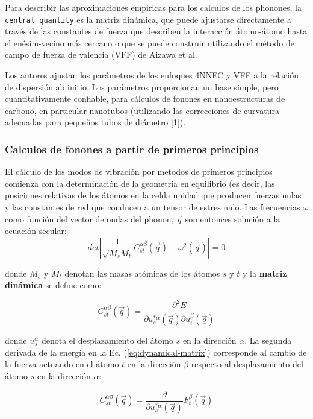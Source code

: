 \documentclass[11pt]{article}
\begin{document}
Para describir las aproximaciones empiricas para los calculos de los phonones, la \texttt{central quantity} es la matriz dinámica, que puede ajustarse directamente a través de las
constantes de fuerza que describen la interacción átomo-átomo hasta el enésim-vecino más cercano o que se puede construir utilizando el método de campo de fuerza de valencia (VFF) de Aizawa et al.

Los autores ajustan los parámetros de los enfoques 4NNFC y VFF a la relación de dispersión ab initio. Los parámetros proporcionan un base simple, pero cuantitativamente confiable, para cálculos de fonones en nanoestructuras de carbono, en particular nanotubos (utilizando las correcciones de curvatura adecuadas para pequeños
tubos de diámetro [1]).

\subsubsection{Calculos de fonones a partir de primeros principios}
\label{sec:org2cad9bc}
El cálculo de los modos de vibración por metodos de primeros principios comienza con la determinación de la geometria en equilibrio (es decir, las posiciones relativas de los átomos en la celda unidad que producen fuerzas nulas y las constantes de red que conducen a un tensor de estres nulo. Las frecuencias \(\omega\) como función del vector de ondas del phonon, \(\vec q\) son entonces solución a la ecuación secular:
\begin{equation}
det\left|\frac{1}{\sqrt{M_s M_t}}C^{\alpha\beta}_{s t}(\vec q)-\omega^2(\vec q)\right|=0
\end{equation}

donde \(M_s\) y \(M_t\) denotan las masas atómicas de los átomos \(s\) y \(t\) y la \textbf{matriz dinámica} se define como: 

\begin{equation}\boxed{
C^{\alpha\beta}_{s t}(\vec q)=\frac{\partial^2E}{\partial u^{*\alpha}_s (\vec q)\partial u^\beta_t(\vec q)}}
\label{eq:dynamical-matrix}
\end{equation}

donde \(u^\alpha_s\) denota el desplazamiento del átomo \(s\) en la dirección \(\alpha\). La segunda derivada de la energía en la Ec. (\ref{eq:dynamical-matrix}) corresponde al cambio de la fuerza actuando en el átomo \(t\) en la dirección \(\beta\) respecto al desplazamiento del átomo \(s\) en la dirección \(\alpha\):

\begin{equation}
C^{\alpha\beta}_{s t}(\vec q)=\frac{\partial}{\partial u^{*\alpha}_s (\vec q)}F^\beta_t(\vec q)
\label{eq:dynamical-matrix}
\end{equation}
\end{document}
